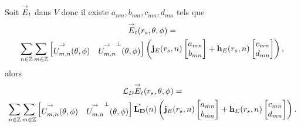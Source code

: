     \begin{prop}
      Soit \({\overset{\rightarrow}{E}}_t\) dans \(V\) donc il existe \(a_{nm},b_{nm},c_{nm},d_{nm}\) tels que
      \begin{multline*}
      {\overset{\rightarrow}{E}}_t(r_s,\theta,\phi) =
      \\
        \sum_{n\in\mathbb Z}\sum_{m\in\mathbb Z}
            \begin{bmatrix}
              {\overset{\rightarrow}{U_{m,n}^{{}}}}(\theta,\phi) & {\overset{\rightarrow}{U_{m,n}^{{}}}}^\perp(\theta,\phi)
            \end{bmatrix}
            \left(
              \mathbf{j}_E(r_s,n)
              \begin{bmatrix}
                  a_{mn}
                  \\
                  b_{mn}
              \end{bmatrix}
              +
              \mathbf{h}_E(r_s,n)
              \begin{bmatrix}
                  c_{mn}
                  \\
                  d_{mn}
              \end{bmatrix}
            \right),
      \end{multline*}
      alors
      \begin{multline*}
        {\mathcal{L}_D}{\overset{\rightarrow}{E}}_t(r_s,\theta,\phi) =
        \\
          \sum_{n\in\mathbb Z}\sum_{m\in\mathbb Z}
            \begin{bmatrix}
              {\overset{\rightarrow}{U_{m,n}^{{}}}}(\theta,\phi) & {\overset{\rightarrow}{U_{m,n}^{{}}}}^\perp(\theta,\phi)
            \end{bmatrix}
            \hat{\mathbf{L_D}}(n)
            \left(
              \mathbf{j}_E(r_s,n)
              \begin{bmatrix}
                  a_{mn}
                  \\
                  b_{mn}
              \end{bmatrix}
              +
              \mathbf{h}_E(r_s,n)
              \begin{bmatrix}
                  c_{mn}
                  \\
                  d_{mn}
              \end{bmatrix}
            \right).
      \end{multline*}
    \end{prop}

